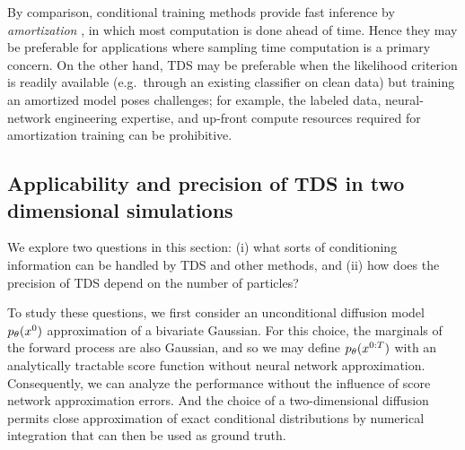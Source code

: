 By comparison, conditional training methods
provide fast inference by \emph{amortization} \citep{gershman2014amortized},
in which most computation is done ahead of time.
Hence they may be preferable for applications where sampling time computation is a primary concern.
On the other hand, TDS may be preferable when the likelihood criterion is readily available (e.g.\ through an existing classifier on clean data) but training an amortized model poses challenges;
for example, the labeled data, neural-network engineering expertise, and up-front compute resources required for amortization training can be prohibitive.

%

\subsection{Applicability and precision of TDS in two dimensional simulations}\label{subsec:exp-toy}
We explore two questions in this section:
(i) what sorts of conditioning information can be handled by TDS and other methods, and 
(ii) how does the precision of TDS depend on the number of particles?

To study these questions, we first consider an unconditional diffusion model $p_{\theta}(x^{0})$ approximation of a bivariate Gaussian.
For this choice, the marginals of the forward process are also Gaussian, and so we may define $p_{\theta}(x^{0:T})$ with an analytically tractable score function without neural network approximation.
Consequently, we can analyze the performance without the influence of score network approximation errors.
And the choice of a two-dimensional diffusion permits close approximation of exact conditional distributions by numerical integration that can then be used as ground truth.

